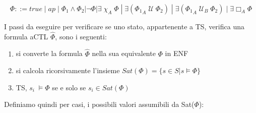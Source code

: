 \begin{equation}
\Phi ::= true \; | \; ap \; | \; \Phi_1 \wedge \Phi_2 |  \neg \Phi | \exists \; \chi_A \; \Phi \; | \; \exists ({\Phi_1}_A \; \mathcal{U}\; \Phi_2) \; | \; \exists ({\Phi_1}_A \; \mathcal{U}_B \; \Phi_2) \; | \; \exists \Box_A \Phi
\end{equation}

I passi da eseguire per verificare se uno stato, appartenente a TS,  verifica una formula aCTL $\hat{\Phi}$, sono i seguenti:

\begin{enumerate}
\item si converte la formula $\hat{\Phi}$ nella sua equivalente $\Phi$ in ENF
\item si calcola ricorsivamente l'insieme $ Sat(\Phi) = \lbrace s \in S | s \models \Phi \rbrace $
\item TS, $s_i \; \models \Phi $ se e solo se $ s_i \in Sat(\Phi) $
\end{enumerate}

\clearpage

Definiamo quindi per casi, i possibili valori assumibili da Sat($\Phi$):


